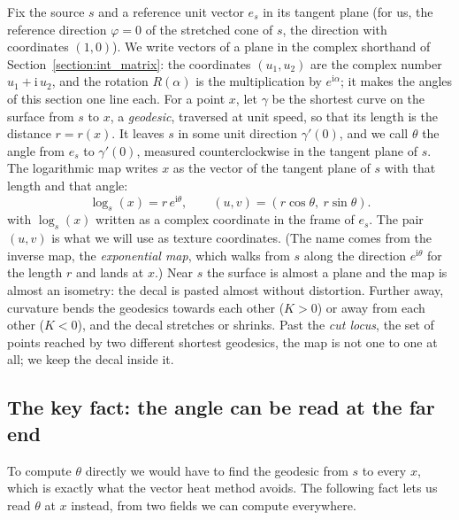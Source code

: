 Fix the source $s$ and a reference unit vector $e_s$ in its tangent plane (for us, the reference direction $\varphi = 0$ of the stretched cone of $s$, the direction with coordinates $(1, 0)$). We write vectors of a plane in the complex shorthand of Section~\ref{section:int_matrix}: the coordinates $(u_1, u_2)$ are the complex number $u_1 + \mathrm i\,u_2$, and the rotation $R(\alpha)$ is the multiplication by $e^{\mathrm i\alpha}$; it makes the angles of this section one line each. For a point $x$, let $\gamma$ be the shortest curve on the surface from $s$ to $x$, a \emph{geodesic}, traversed at unit speed, so that its length is the distance $r = r(x)$. It leaves $s$ in some unit direction $\gamma'(0)$, and we call $\theta$ the angle from $e_s$ to $\gamma'(0)$, measured counterclockwise in the tangent plane of $s$. The logarithmic map writes $x$ as the vector of the tangent plane of $s$ with that length and that angle:
\begin{equation}
\label{eqn:app_log}
\log_s(x) = r\, e^{\mathrm i\theta}, \qquad (u, v) = (r\cos\theta,\ r\sin\theta) .
\end{equation}
with $\log_s(x)$ written as a complex coordinate in the frame of $e_s$. The pair $(u, v)$ is what we will use as texture coordinates. (The name comes from the inverse map, the \emph{exponential map}, which walks from $s$ along the direction $e^{\mathrm i\theta}$ for the length $r$ and lands at $x$.) Near $s$ the surface is almost a plane and the map is almost an isometry: the decal is pasted almost without distortion. Further away, curvature bends the geodesics towards each other ($K > 0$) or away from each other ($K < 0$), and the decal stretches or shrinks. Past the \emph{cut locus}, the set of points reached by two different shortest geodesics, the map is not one to one at all; we keep the decal inside it.

\subsection{The key fact: the angle can be read at the far end}

To compute $\theta$ directly we would have to find the geodesic from $s$ to every $x$, which is exactly what the vector heat method avoids. The following fact lets us read $\theta$ at $x$ instead, from two fields we can compute everywhere.

